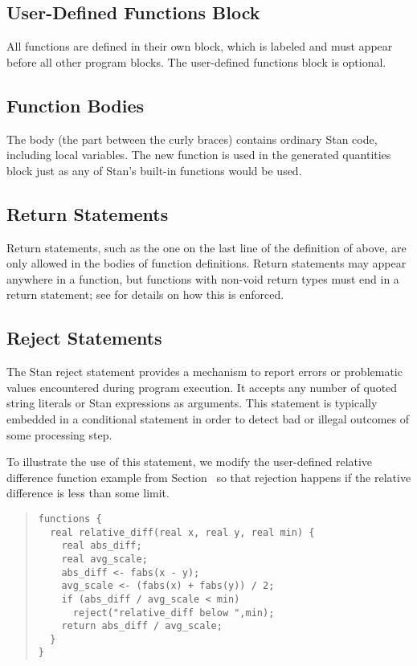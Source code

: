 \subsection{User-Defined Functions Block}

All functions are defined in their own block, which is labeled
 and must appear before all other program blocks.  The
user-defined functions block is optional.

\subsection{Function Bodies}

The body (the part between the curly braces) contains ordinary Stan
code, including local variables.  The new function is used in the
generated quantities block just as any of Stan's built-in functions
would be used.

\subsection{Return Statements}

Return statements, such as the one on the last line of the definition
of  above, are only allowed in the bodies of
function definitions.  Return statements may appear anywhere in a
function, but functions with non-void return types must end in a
return statement; see  for details on how
this is enforced.

\subsection{Reject Statements}

The Stan reject statement provides a mechanism to report errors or problematic
values encountered during program execution.
It accepts any number of quoted string literals or Stan expressions as arguments.
This statement is typically embedded in a conditional statement in order to
detect bad or illegal outcomes of some processing step.

To illustrate the use of this statement, we modify the user-defined
relative difference function example from Section~
so that rejection happens if the relative difference is less than
some limit.
%
\begin{quote}
\begin{Verbatim}
functions {
  real relative_diff(real x, real y, real min) {
    real abs_diff;
    real avg_scale;
    abs_diff <- fabs(x - y);
    avg_scale <- (fabs(x) + fabs(y)) / 2;
    if (abs_diff / avg_scale < min) 
      reject("relative_diff below ",min);
    return abs_diff / avg_scale;
  }
}
\end{Verbatim}
\end{quote}

